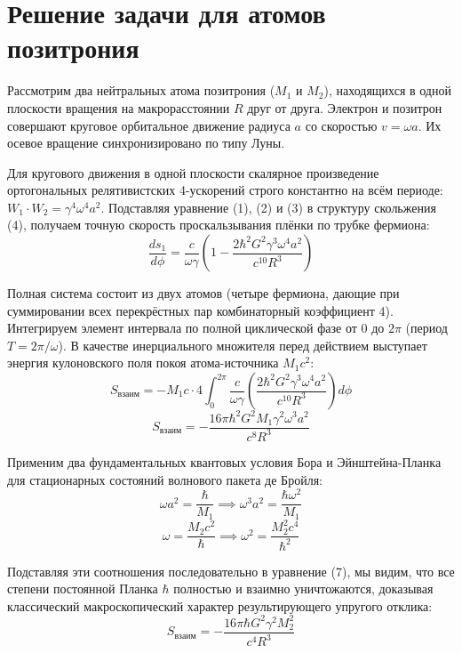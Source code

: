\documentclass[twocolumn,PRD,amsmath,amssymb,superscriptaddress]{revtex4-1}
\begin{document}
\section{Решение задачи для атомов позитрония}
Рассмотрим два нейтральных атома позитрония ($M_1$ и $M_2$), находящихся в одной плоскости вращения на макрорасстоянии $R$ друг от друга. Электрон и позитрон совершают круговое орбитальное движение радиуса $a$ со скоростью $v = \omega a$. Их осевое вращение синхронизировано по типу Луны.

Для кругового движения в одной плоскости скалярное произведение ортогональных релятивистских 4-ускорений строго константно на всём периоде: $W_1 \cdot W_2 = \gamma^4 \omega^4 a^2$. Подставляя уравнение (1), (2) и (3) в структуру скольжения (4), получаем точную скорость проскальзывания плёнки по трубке фермиона:
\begin{equation}
\frac{ds_1}{d\phi} = \frac{c}{\omega \gamma} \left( 1 - \frac{2 \hbar^2 G^2 \gamma^3 \omega^4 a^2}{c^{10} R^3} \right)
\end{equation}

Полная система состоит из двух атомов (четыре фермиона, дающие при суммировании всех перекрёстных пар комбинаторный коэффициент 4). Интегрируем элемент интервала по полной циклической фазе от $0$ до $2\pi$ (период $T = 2\pi/\omega$). В качестве инерциального множителя перед действием выступает энергия кулоновского поля покоя атома-источника $M_1 c^2$:
\begin{equation}
S_{взаим} = - M_1 c \cdot 4 \int_0^{2\pi} \frac{c}{\omega \gamma} \left( \frac{2 \hbar^2 G^2 \gamma^3 \omega^4 a^2}{c^{10} R^3} \right) d\phi
\end{equation}
\begin{equation}
S_{взаим} = - \frac{16\pi \hbar^2 G^2 M_1 \gamma^2 \omega^3 a^2}{c^8 R^3}
\end{equation}

Применим два фундаментальных квантовых условия Бора и Эйнштейна-Планка для стационарных состояний волнового пакета де Бройля:
\begin{equation}
\omega a^2 = \frac{\hbar}{M_1} \implies \omega^3 a^2 = \frac{\hbar \omega^2}{M_1}
\end{equation}
\begin{equation}
\omega = \frac{M_2 c^2}{\hbar} \implies \omega^2 = \frac{M_2^2 c^4}{\hbar^2}
\end{equation}

Подставляя эти соотношения последовательно в уравнение (7), мы видим, что все степени постоянной Планка $\hbar$ полностью и взаимно уничтожаются, доказывая классический макроскопический характер результирующего упругого отклика:
\begin{equation}
S_{взаим} = - \frac{16\pi \hbar G^2 \gamma^2 M_2^2}{c^4 R^3}
\end{equation}
\end{document}
